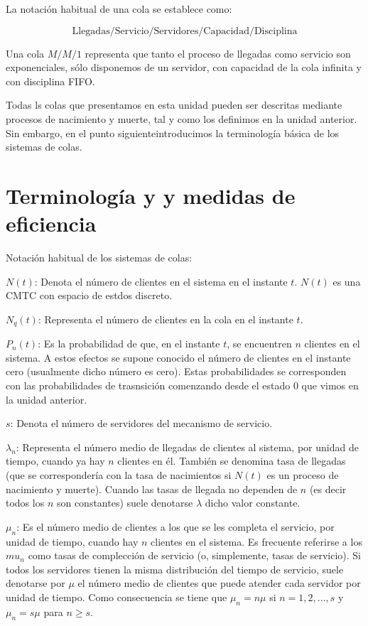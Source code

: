 \documentclass[
]{book}
\theoremstyle{definition}
\theoremstyle{definition}
\theoremstyle{definition}
\theoremstyle{definition}
\theoremstyle{remark}
\begin{document}
La notación habitual de una cola se establece como:

\[\text{Llegadas} / \text{Servicio} / \text{Servidores} / \text{Capacidad} / \text{Disciplina}\]

Una cola \(M/M/1\) representa que tanto el proceso de llegadas como servicio son exponenciales, sólo disponemos de un servidor, con capacidad de la cola infinita y con disciplina FIFO.

Todas ls colas que presentamos en esta unidad pueden ser descritas mediante procesos de nacimiento y muerte, tal y como los definimos en la unidad anterior. Sin embargo, en el punto siguienteintroducimos la terminología básica de los sistemas de colas.

\hypertarget{COLASA}{%
\section{Terminología y y medidas de eficiencia}\label{COLASA}}

Notación habitual de los sistemas de colas:

\textbf{\(N(t)\)}: Denota el número de clientes en el sistema en el instante \(t\). \(N(t)\) es una CMTC con espacio de estdos discreto.

\textbf{\(N_q(t)\)}: Representa el número de clientes en la cola en el instante \(t\).

\textbf{\(P_n(t)\)}: Es la probabilidad de que, en el instante \(t\), se encuentren \(n\) clientes en el sistema. A estos efectos se supone conocido el número de clientes en el instante cero (usualmente dicho número es cero). Estas probabilidades se corresponden con las probabilidades de trasnsición comenzando desde el estado 0 que vimos en la unidad anterior.

\textbf{\(s\)}: Denota el número de servidores del mecanismo de servicio.

\textbf{\(\lambda_n\)}: Representa el número medio de llegadas de clientes al sistema, por unidad de tiempo, cuando ya hay \(n\) clientes en él. También se denomina tasa de llegadas (que se correspondería con la tasa de nacimientos si \(N(t)\) es un proceso de nacimiento y muerte). Cuando las tasas de llegada no dependen de \(n\) (es decir todos los \(n\) son constantes) suele denotarse \(\lambda\) dicho valor constante.

\textbf{\(\mu_n\)}: Es el número medio de clientes a los que se les completa el servicio, por unidad de tiempo, cuando hay \(n\) clientes en el sistema. Es frecuente referirse a los \(mu_n\) como tasas de complección de servicio (o, simplemente, tasas de servicio). Si todos los servidores tienen la misma distribución del tiempo de servicio, suele denotarse por \(\mu\) el número medio de clientes que puede atender cada servidor por unidad de tiempo. Como consecuencia se tiene que \(\mu_n = n\mu\) si \(n = 1, 2,... ,s\) y \(\mu_n = s\mu\) para \(n \geq s\).
\end{document}
